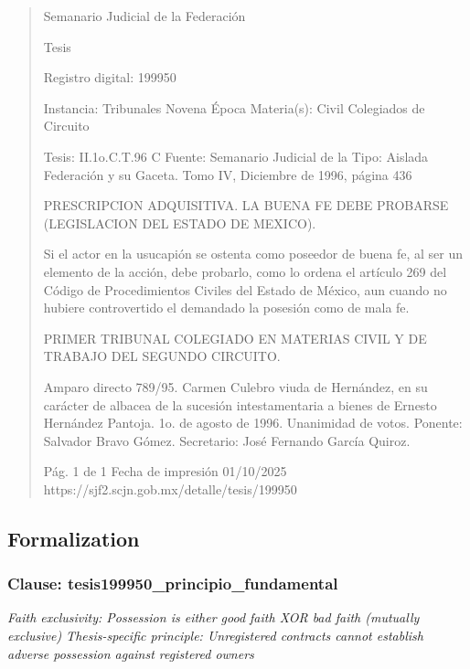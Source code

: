 \documentclass[11pt,a4paper]{article}
\begin{document}
\begin{quote}
                                                   Semanario Judicial de la Federación

                                                  Tesis

 Registro digital: 199950

 Instancia: Tribunales            Novena Época                       Materia(s): Civil
 Colegiados de Circuito

 Tesis: II.1o.C.T.96 C            Fuente: Semanario Judicial de la   Tipo: Aislada
                                  Federación y su Gaceta.
                                  Tomo IV, Diciembre de 1996, página
                                  436


PRESCRIPCION ADQUISITIVA. LA BUENA FE DEBE PROBARSE (LEGISLACION DEL ESTADO
DE MEXICO).


Si el actor en la usucapión se ostenta como poseedor de buena fe, al ser un elemento de la acción,
debe probarlo, como lo ordena el artículo 269 del Código de Procedimientos Civiles del Estado de
México, aun cuando no hubiere controvertido el demandado la posesión como de mala fe.

PRIMER TRIBUNAL COLEGIADO EN MATERIAS CIVIL Y DE TRABAJO DEL SEGUNDO
CIRCUITO.


Amparo directo 789/95. Carmen Culebro viuda de Hernández, en su carácter de albacea de la
sucesión intestamentaria a bienes de Ernesto Hernández Pantoja. 1o. de agosto de 1996.
Unanimidad de votos. Ponente: Salvador Bravo Gómez. Secretario: José Fernando García Quiroz.




                                             Pág. 1 de 1          Fecha de impresión 01/10/2025
  https://sjf2.scjn.gob.mx/detalle/tesis/199950

\end{quote}

\subsection{Formalization}

\subsubsection{Clause: tesis199950\_principio\_fundamental}

\textit{Faith exclusivity: Possession is either good faith XOR bad faith (mutually exclusive) Thesis-specific principle: Unregistered contracts cannot establish adverse possession against registered owners}
\end{document}
